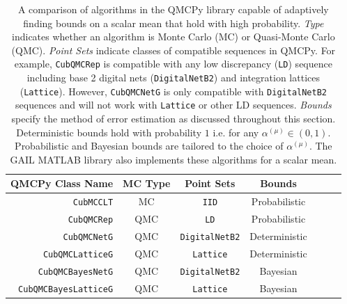 \documentclass[graybox]{svmult}
\begin{document}
\begin{table}[t]
\centering
\begin{tabular}{r c c c c c c}
    QMCPy Class Name & MC Type & Point Sets & Bounds \\
    \hline
    \texttt{CubMCCLT} \cite{cubmcg} & MC & \texttt{IID} & Probabilistic \\
    \texttt{CubQMCRep} \cite{mcbook} & QMC & \texttt{LD} & Probabilistic \\
    \texttt{CubQMCNetG} \cite{cubqmcsobol} & QMC & \texttt{DigitalNetB2} & Deterministic \\
    \texttt{CubQMCLatticeG} \cite{cubqmclattice} & QMC & \texttt{Lattice} & Deterministic \\
    \texttt{CubQMCBayesNetG} \cite{cubqmcbayessobol} & QMC &  \texttt{DigitalNetB2} & Bayesian \\
    \texttt{CubQMCBayesLatticeG} \cite{cubqmcbayeslattice} & QMC & \texttt{Lattice} & Bayesian \\
    \hline
\end{tabular}
\caption{A comparison of algorithms in the QMCPy library capable of adaptively finding bounds on a scalar mean that hold with high probability. \emph{Type} indicates whether an algorithm is Monte Carlo (MC) or Quasi-Monte Carlo (QMC). \emph{Point Sets} indicate classes of compatible sequences in QMCPy. For example, \texttt{CubQMCRep} is compatible with any low discrepancy (\texttt{LD}) sequence including base 2 digital nets (\texttt{DigitalNetB2}) and integration lattices (\texttt{Lattice}). However, \texttt{CubQMCNetG} is only compatible with \texttt{DigitalNetB2} sequences and will not work with \texttt{Lattice} or other LD sequences. \emph{Bounds} specify the method of error estimation as discussed throughout this section. Deterministic bounds hold with probability $1$ i.e. for any $\alpha^{(\mu)} \in (0,1)$. Probabilistic and Bayesian bounds are tailored to the choice of $\alpha^{(\mu)}$. The GAIL MATLAB library \cite{ChoEtal21a} also implements these algorithms for a scalar mean. }
\label{SoRa_table:qmcpy_sc}
\end{table}
\end{document}
